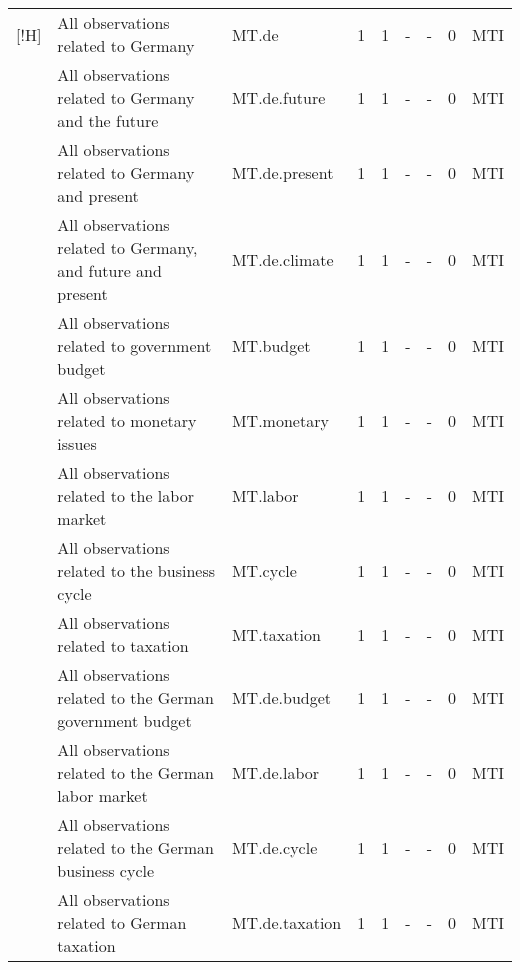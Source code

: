\documentclass[10pt]{article}
\begin{document}
\begin{footnotesize}
\begin{longtable}{p{1in}|p{2.5in}|p{1in}|p{.1in}|p{.1in}|p{.1in}|p{.15in}|p{.1in}|p{.5in}}[!H]
 & {\tiny{}All observations related to Germany} & {\tiny{}MT.de} & {\tiny{}1} & {\tiny{}1} & {\tiny{}-} & {\tiny{}-} & {\tiny{}0} & {\tiny{}MTI}\tabularnewline
 & {\tiny{}All observations related to Germany and the future} & {\tiny{}MT.de.future} & {\tiny{}1} & {\tiny{}1} & {\tiny{}-} & {\tiny{}-} & {\tiny{}0} & {\tiny{}MTI}\tabularnewline
 & {\tiny{}All observations related to Germany and present} & {\tiny{}MT.de.present} & {\tiny{}1} & {\tiny{}1} & {\tiny{}-} & {\tiny{}-} & {\tiny{}0} & {\tiny{}MTI}\tabularnewline
 & {\tiny{}All observations related to Germany, and future and present} & {\tiny{}MT.de.climate} & {\tiny{}1} & {\tiny{}1} & {\tiny{}-} & {\tiny{}-} & {\tiny{}0} & {\tiny{}MTI}\tabularnewline
 & {\tiny{}All observations related to government budget} & {\tiny{}MT.budget} & {\tiny{}1} & {\tiny{}1} & {\tiny{}-} & {\tiny{}-} & {\tiny{}0} & {\tiny{}MTI}\tabularnewline
 & {\tiny{}All observations related to monetary issues} & {\tiny{}MT.monetary} & {\tiny{}1} & {\tiny{}1} & {\tiny{}-} & {\tiny{}-} & {\tiny{}0} & {\tiny{}MTI}\tabularnewline
 & {\tiny{}All observations related to the labor market} & {\tiny{}MT.labor} & {\tiny{}1} & {\tiny{}1} & {\tiny{}-} & {\tiny{}-} & {\tiny{}0} & {\tiny{}MTI}\tabularnewline
 & {\tiny{}All observations related to the business cycle} & {\tiny{}MT.cycle} & {\tiny{}1} & {\tiny{}1} & {\tiny{}-} & {\tiny{}-} & {\tiny{}0} & {\tiny{}MTI}\tabularnewline
 & {\tiny{}All observations related to taxation} & {\tiny{}MT.taxation} & {\tiny{}1} & {\tiny{}1} & {\tiny{}-} & {\tiny{}-} & {\tiny{}0} & {\tiny{}MTI}\tabularnewline
 & {\tiny{}All observations related to the German government budget} & {\tiny{}MT.de.budget} & {\tiny{}1} & {\tiny{}1} & {\tiny{}-} & {\tiny{}-} & {\tiny{}0} & {\tiny{}MTI}\tabularnewline
 & {\tiny{}All observations related to the German labor market} & {\tiny{}MT.de.labor} & {\tiny{}1} & {\tiny{}1} & {\tiny{}-} & {\tiny{}-} & {\tiny{}0} & {\tiny{}MTI}\tabularnewline
 & {\tiny{}All\tnote{1} observations related to the German business cycle} & {\tiny{}MT.de.cycle} & {\tiny{}1} & {\tiny{}1} & {\tiny{}-} & {\tiny{}-} & {\tiny{}0} & {\tiny{}MTI}\tabularnewline
 & {\tiny{}All observations related to German taxation} & {\tiny{}MT.de.taxation} & {\tiny{}1} & {\tiny{}1} & {\tiny{}-} & {\tiny{}-} & {\tiny{}0} & {\tiny{}MTI}\tabularnewline
\bottomrule

\end{longtable}

\end{footnotesize}
\end{document}
